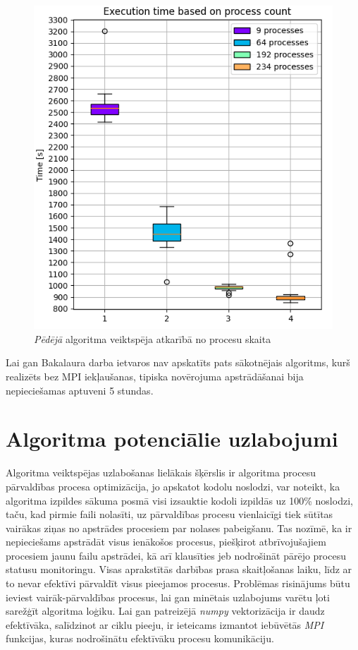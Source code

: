 \begin{figure}[H]
\includegraphics[width=\textwidth]{images/created/all-bench-rez.png}

\caption{\textit{Pēdējā} algoritma veiktspēja atkarībā no procesu skaita}
\centering
\label{fig:all-bench}
\end{figure}

Lai gan Bakalaura darba ietvaros nav apskatīts pats sākotnējais algoritms, kurš realizēts bez MPI iekļaušanas, tipiska novērojuma apstrādāšanai bija nepieciešamas aptuveni 5 stundas.



\section{Algoritma potenciālie uzlabojumi}

Algoritma veiktspējas uzlabošanas lielākais šķērslis ir algoritma procesu pārvaldības procesa optimizācija, jo apskatot kodolu noslodzi, var noteikt, ka algoritma izpildes sākuma posmā visi izsauktie kodoli izpildās uz 100\% noslodzi, taču, kad pirmie faili nolasīti, uz pārvaldības procesu vienlaicīgi tiek sūtītas vairākas ziņas no apstrādes procesiem par nolases pabeigšanu. Tas nozīmē, ka ir nepieciešams apstrādāt visus ienākošos procesus, piešķirot atbrīvojušajiem procesiem jaunu failu apstrādei, kā arī klausīties jeb nodrošināt pārējo procesu statusu monitoringu. Visas aprakstītās darbības prasa skaitļošanas laiku, līdz ar to nevar efektīvi pārvaldīt visus pieejamos procesus. Problēmas risinājums būtu ieviest vairāk-pārvaldības procesus, lai gan minētais uzlabojums varētu ļoti sarežģīt algoritma loģiku. Lai gan patreizējā \textit{numpy} vektorizācija ir daudz efektīvāka, salīdzinot ar ciklu pieeju, ir ieteicams izmantot iebūvētās \textit{MPI} funkcijas, kuras nodrošinātu efektīvāku procesu komunikāciju.



